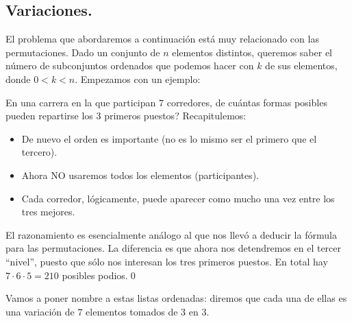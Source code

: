 \subsection{Variaciones.}
\label{cap03:subsec:variaciones}

El problema que abordaremos a continuación est\'a muy relacionado con las permutaciones.
Dado un conjunto de $n$ elementos distintos, queremos saber el número de subconjuntos ordenados que podemos hacer con $k$ de sus elementos, donde $0<k<n$. Empezamos con un ejemplo:

\begin{Ejemplo} En una carrera en la que participan $7$ corredores,
de cu\'antas formas posibles pueden repartirse los $3$ primeros puestos?
Recapitulemos:
\begin{itemize}
	\item De nuevo el orden es importante (no es lo mismo ser el primero
		que el tercero).
	\item Ahora NO usaremos todos los elementos (participantes).
	\item Cada corredor, l\'ogicamente, puede aparecer como mucho una vez entre los tres mejores.
\end{itemize}
El razonamiento es esencialmente an\'alogo al que nos llev\'o a deducir la
f\'ormula para las permutaciones. La diferencia es que ahora nos detendremos
en el tercer ``nivel'', puesto que s\'olo nos interesan los tres primeros puestos.
En total hay $7\cdot 6 \cdot 5 =210$ posibles podios.\qed
\end{Ejemplo}
Vamos a poner nombre a estas listas ordenadas: diremos que cada una de ellas es una
{ \sf variaci\'on de $7$ elementos tomados de $3$ en $3$}.

